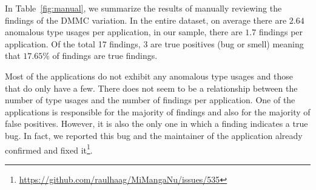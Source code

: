 \begin{table}[t]
    \centering
    \caption{The results of the manual evaluation}\label{fig:manual}
\end{table}

In Table~\ref{fig:manual}, we summarize the results of manually reviewing the findings of the $\text{DMMC}$ variation.
In the entire dataset, on average there are $2.64$ anomalous type usages per application, in our sample, there are $1.7$ findings per application.
Of the total 17 findings, 3 are true positives (bug or smell) meaning that $17.65\%$ of findings are true findings.

Most of the applications do not exhibit any anomalous type usages and those that do only have a few.
There does not seem to be a relationship between the number of type usages and the number of findings per application.
One of the applications is responsible for the majority of findings and also for the majority of false positives.
However, it is also the only one in which a finding indicates a true bug.
In fact, we reported this bug and the maintainer of the application already confirmed and fixed it\footnote{\url{https://github.com/raulhaag/MiMangaNu/issues/535}}.


